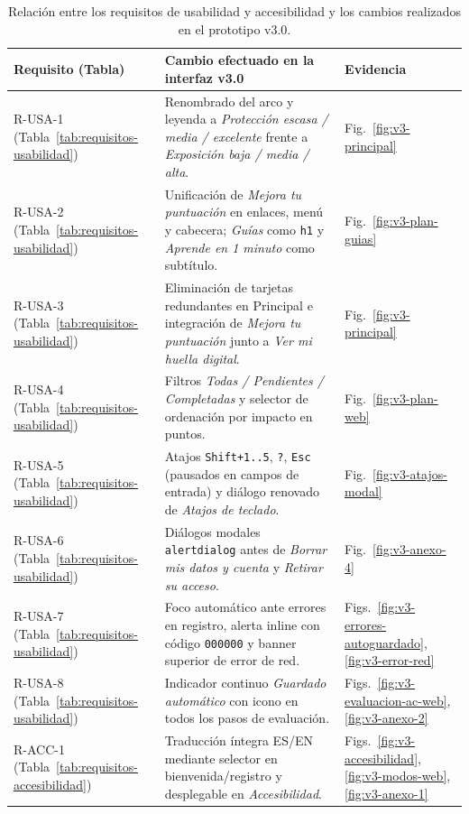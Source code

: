 \begin{table}[H]
  \centering
  \caption{Relación entre los requisitos de usabilidad y accesibilidad y los cambios realizados en el prototipo v3.0.}
  \label{tab:trazabilidad-v3}
  \small
  \begin{tabularx}{\textwidth}{@{}l X l@{}}
    \toprule
    \textbf{Requisito (Tabla)} & \textbf{Cambio efectuado en la interfaz v3.0} & \textbf{Evidencia} \\
    \midrule
    R-USA-1 (Tabla~\ref{tab:requisitos-usabilidad}) & Renombrado del arco y leyenda a \textit{Protección escasa / media / excelente} frente a \textit{Exposición baja / media / alta}. & Fig.~\ref{fig:v3-principal} \\
    R-USA-2 (Tabla~\ref{tab:requisitos-usabilidad}) & Unificación de \textit{Mejora tu puntuación} en enlaces, menú y cabecera; \textit{Guías} como \texttt{h1} y \textit{Aprende en 1 minuto} como subtítulo. & Fig.~\ref{fig:v3-plan-guias} \\
    R-USA-3 (Tabla~\ref{tab:requisitos-usabilidad}) & Eliminación de tarjetas redundantes en Principal e integración de \textit{Mejora tu puntuación} junto a \textit{Ver mi huella digital}. & Fig.~\ref{fig:v3-principal} \\
    R-USA-4 (Tabla~\ref{tab:requisitos-usabilidad}) & Filtros \textit{Todas / Pendientes / Completadas} y selector de ordenación por impacto en puntos. & Fig.~\ref{fig:v3-plan-web} \\
    R-USA-5 (Tabla~\ref{tab:requisitos-usabilidad}) & Atajos \texttt{Shift+1..5}, \texttt{?}, \texttt{Esc} (pausados en campos de entrada) y diálogo renovado de \textit{Atajos de teclado}. & Fig.~\ref{fig:v3-atajos-modal} \\
    R-USA-6 (Tabla~\ref{tab:requisitos-usabilidad}) & Diálogos modales \texttt{alertdialog} antes de \textit{Borrar mis datos y cuenta} y \textit{Retirar su acceso}. & Fig.~\ref{fig:v3-anexo-4} \\
    R-USA-7 (Tabla~\ref{tab:requisitos-usabilidad}) & Foco automático ante errores en registro, alerta inline con código \texttt{000000} y banner superior de error de red. & Figs.~\ref{fig:v3-errores-autoguardado}, \ref{fig:v3-error-red} \\
    R-USA-8 (Tabla~\ref{tab:requisitos-usabilidad}) & Indicador continuo \textit{Guardado automático} con icono en todos los pasos de evaluación. & Figs.~\ref{fig:v3-evaluacion-ac-web}, \ref{fig:v3-anexo-2} \\
    \midrule
    R-ACC-1 (Tabla~\ref{tab:requisitos-accesibilidad}) & Traducción íntegra ES/EN mediante selector en bienvenida/registro y desplegable en \textit{Accesibilidad}. & Figs.~\ref{fig:v3-accesibilidad}, \ref{fig:v3-modos-web}, \ref{fig:v3-anexo-1} \\

\end{tabularx}
\end{table}
